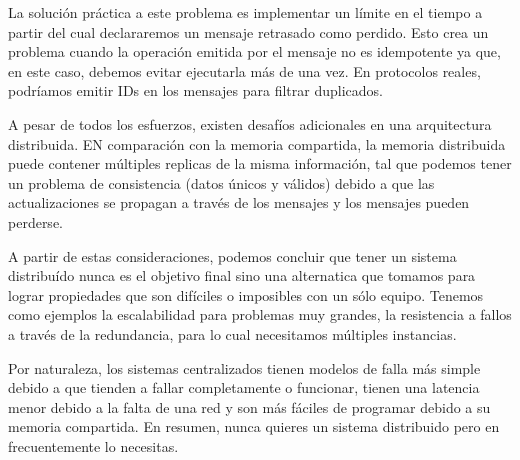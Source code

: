 \documentclass[12pt]{article}
\begin{document}
La solución práctica a este problema es implementar un límite en el tiempo a partir del cual declararemos un mensaje retrasado como perdido.
Esto crea un problema cuando la operación emitida por el mensaje no es idempotente  ya que, en este caso, debemos evitar ejecutarla más de una vez.
En protocolos reales, 
podríamos emitir IDs en los mensajes para filtrar duplicados.

A pesar de todos los esfuerzos,
existen desafíos adicionales en una arquitectura distribuida.
EN comparación con la memoria compartida,
la memoria distribuida puede contener múltiples replicas de la misma información,
tal que podemos tener un problema de consistencia 
(datos únicos y válidos)
debido a que las actualizaciones se propagan a través de los mensajes y los mensajes pueden perderse.

A partir de estas consideraciones, 
podemos concluir que tener un sistema distribuído nunca es el objetivo final sino una alternatica que tomamos para lograr propiedades que son difíciles o imposibles con un sólo equipo.
Tenemos como ejemplos la escalabilidad para problemas muy grandes,
la resistencia a fallos a través de la redundancia,
para lo cual necesitamos múltiples instancias.

Por naturaleza, 
los sistemas centralizados tienen modelos de falla más simple debido a que tienden a fallar completamente o funcionar,
tienen una latencia menor debido a la falta de una red y son más fáciles de programar debido a su memoria compartida.
En resumen, nunca quieres un sistema distribuido pero en frecuentemente lo necesitas.
\end{document}

